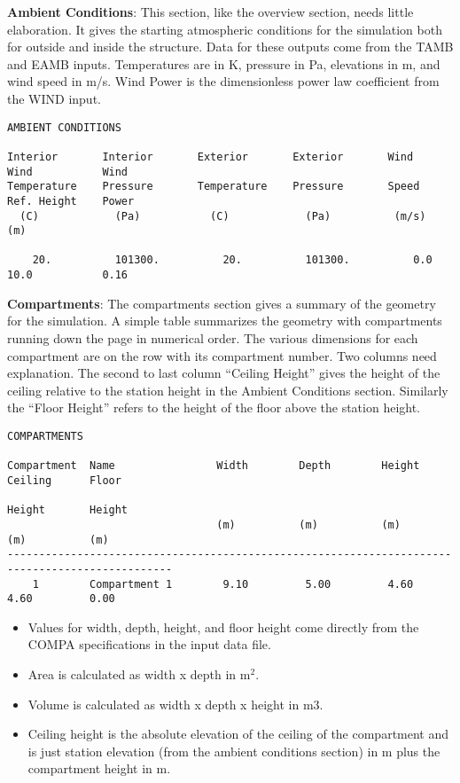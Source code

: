 \textbf{Ambient Conditions}: This section, like the overview section, needs little elaboration.  It gives the starting atmospheric conditions for the simulation both for outside and inside the structure. Data for these outputs come from the TAMB and EAMB inputs. Temperatures are in K, pressure in Pa, elevations in m, and wind speed in m/s. Wind Power is the dimensionless power law coefficient from the WIND input.

\begin{lstlisting}[basicstyle=\tiny]
AMBIENT CONDITIONS

Interior       Interior       Exterior       Exterior       Wind           Wind           Wind           
Temperature    Pressure       Temperature    Pressure       Speed          Ref. Height    Power
  (C)            (Pa)           (C)            (Pa)          (m/s)          (m)

    20.          101300.          20.          101300.          0.0           10.0           0.16
\end{lstlisting}

\textbf{Compartments}: The compartments section gives a summary of the geometry for the simulation.  A simple table summarizes the geometry with compartments running down the page in numerical order.  The various dimensions for each compartment are on the row with its compartment number.  Two columns need explanation.  The second to last column ``Ceiling Height'' gives the height of the ceiling relative to the station height in the Ambient Conditions section.  Similarly the ``Floor Height'' refers to the height of the floor above the station height.

\begin{lstlisting}[basicstyle=\tiny]
COMPARTMENTS

Compartment  Name                Width        Depth        Height       Ceiling      Floor     
                                                                        Height       Height    
                                 (m)          (m)          (m)          (m)          (m)
------------------------------------------------------------------------------------------------
    1        Compartment 1        9.10         5.00         4.60         4.60         0.00
\end{lstlisting}

\begin{itemize}
\item Values for width, depth, height, and floor height come directly from the COMPA specifications in the input data file. 
\item Area is calculated as width x depth in m$^2$. 
\item Volume is calculated as width x depth x height in m3. 
\item Ceiling height is the absolute elevation of the ceiling of the compartment and is just station elevation (from the ambient conditions section) in m plus the compartment height in m.
\end{itemize}

